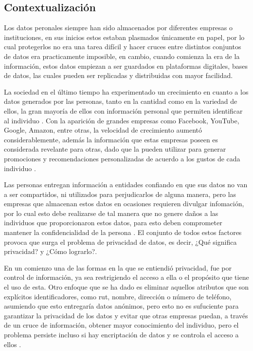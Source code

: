 
\subsection{Contextualización}
Los datos peronales siempre han sido almacenados por diferentes empresas o instituciones, en sus inicios estos estaban plasmados únicamente en papel, por lo cual protegerlos no era una tarea difícil y hacer cruces entre distintos conjuntos de datos era practicamente imposible, en cambio, cuando comienza la era de la información, estos datos empiezan a ser guardados en plataformas digitales, bases de datos, las cuales pueden ser replicadas y distribuidas con mayor facilidad.

La sociedad en el último tiempo ha experimentado un crecimiento en cuanto a los datos generados por las personas, tanto en la cantidad como en la variedad de ellos, la gran mayoría de ellos con información personal que permiten identificar al individuo  \cite{dwork2011firm}. Con la aparición de grandes empresas como Facebook, YouTube, Google, Amazon, entre otras, la velocidad de crecimiento aumentó considerablemente, además la información que estas empresas poseen es considerada revelante para otras, dado que la pueden utilizar para generar promociones y recomendaciones personalizadas de acuerdo a los gustos de cada individuo \cite{wang2012differential}.

Las personas entregan información a entidades confiando en que sus datos no van a ser compartidos, ni utilizados para perjudicarlos de alguna manera, pero las empresas que almacenan estos datos en ocasiones requieren divulgar infomación, por lo cual esto debe realizarse de tal manera que no genere daños a las individuos que proporcionaron estos datos, para esto deben comprometer mantener la confidencialidad de la persona \cite{dwork2011firm}. El conjunto de todos estos factores provoca que surga el problema de privacidad de datos, es decir, ¿Qué significa privacidad? y ¿Cómo lograrlo?.

En un comienzo una de las formas en la que se entiendió privacidad, fue por control de información, ya sea restrigiendo el acceso a ella o el propósito que tiene el uso de esta. Otro enfoque que se ha
dado es eliminar aquellos atributos que son explícitos identificadores, como rut, nombre, dirección o número de teléfono, asumiendo que esto entregaría datos anónimos, pero esto no es sufuciente para garantizar la privacidad de los datos y evitar que otras empresas puedan, a través de un cruce de información, obtener mayor conocimiento del individuo, pero el problema persiste incluso si hay encriptación de datos y se controla el acceso a ellos \cite{dwork2011firm}.

